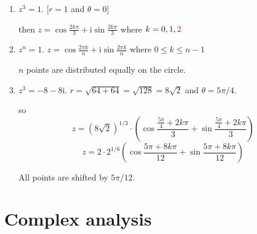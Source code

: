 \documentclass{article}
\newcommand{\mathi}{\mathrm{i}}
\newcommand{\mathpi}{\pi}
\newcommand{\tmcolor}[2]{{\color{#1}{#2}}}
\newenvironment{enumeratenumeric}{\begin{enumerate}[1.] }{\end{enumerate}}
\begin{document}
\begin{enumeratenumeric}
  \item $z^3 = 1$. [$r = 1$ and $\theta = 0$]
  
  \begin{center}
  \end{center}
  
  then $z = \cos \frac{2 k \mathpi}{3} + \mathi \sin \frac{2 k \mathpi}{3}$
  where $k = 0, \tmcolor{blue}{1}, \tmcolor{red}{2}$
  
  \item $z^n = 1$. $z = \cos \frac{2 \mathpi k}{n} + \mathi \sin \frac{2
  \mathpi k}{n}$ where $0 \leq k \leq n - 1$
  
  \begin{center}
  \end{center}
  
  $n$ points are distributed equally on the circle.
  
  \item $z^3 = - 8 - 8 \mathi$. $r = \sqrt{64 + 64} = \sqrt{128} = 8 \sqrt{2}$
  and $\theta = 5 \mathpi / 4$.
  
  \begin{center}
  \end{center}
  
  so
  \[ z = \left( 8 \sqrt{2} \right)^{1 / 3} \cdot \left( \cos \frac{\frac{5
     \mathpi}{4} + 2 k \mathpi}{3} + \sin \frac{\frac{5 \mathpi}{4} + 2 k
     \mathpi}{3} \right) \]
  \[ z = 2 \cdot 2^{1 / 6}  \left( \cos \frac{5 \mathpi + 8 k \mathpi}{12} +
     \sin \frac{5 \mathpi + 8 k \mathpi}{12} \right) \]
  \begin{center}
  \end{center}
  
  All points are shifted by $5 \mathpi / 12$.
\end{enumeratenumeric}

\section*{Complex analysis}
\end{document}
